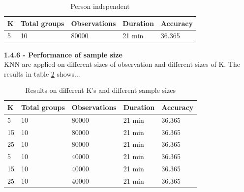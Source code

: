 \begin{table}[H]
\centering
\begin{tabular}{|l|l|l|l|l|}
\hline
K  & Total groups & Observations & Duration &  Accuracy \\ \hline
5  & 10           & 80000                  & 21 min   & 36.365        \\ 
\hline
\end{tabular}
\caption{Person independent}
\label{table:person_independent}
\end{table}

\noindent
\textbf{1.4.6 - Performance of sample size}\\

KNN are applied on different sizes of observation and different sizes of K. The results in table \ref{table:different_sizes} shows...

\begin{table}[H]
\centering
\begin{tabular}{|l|l|l|l|l|}
\hline
K  & Total groups & Observations & Duration &  Accuracy \\ \hline
5  & 10           & 80000                  & 21 min   & 36.365        \\ \hline
15 & 10           & 80000                  & 21 min   & 36.365        \\ \hline
25 & 10           & 80000                  & 21 min   & 36.365        \\ \hline
5  & 10           & 40000                  & 21 min   & 36.365        \\ \hline
15 & 10           & 40000                  & 21 min   & 36.365        \\ \hline
25 & 10           & 40000                  & 21 min   & 36.365        \\ \hline
\end{tabular}
\caption{Results on different K's and different sample sizes}
\label{table:different_sizes}
\end{table}